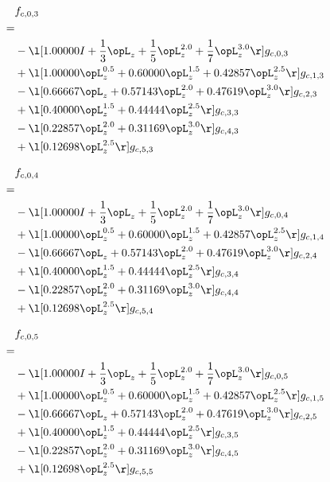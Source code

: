 \begin{alignat}{2} 
\label{eq:f_03_0} 
& f_{c,0,3} \nonumber \\ 
 = \\ 
& - \l[  1.00000 I + \frac{1}{3} \opL_z + \frac{1}{5} \opL_z^{2.0} + \frac{1}{7} \opL_z^{3.0}  \r] g_{c,0,3} \nonumber \\ 
& + \l[  1.00000 \opL_z^{0.5} +  0.60000 \opL_z^{1.5} +  0.42857 \opL_z^{2.5}  \r] g_{c,1,3} \nonumber \\ 
& - \l[  0.66667 \opL_z +  0.57143 \opL_z^{2.0} +  0.47619 \opL_z^{3.0}  \r] g_{c,2,3} \nonumber \\ 
& + \l[  0.40000 \opL_z^{1.5} +  0.44444 \opL_z^{2.5}  \r] g_{c,3,3} \nonumber \\ 
& - \l[  0.22857 \opL_z^{2.0} +  0.31169 \opL_z^{3.0}  \r] g_{c,4,3} \nonumber \\ 
& + \l[  0.12698 \opL_z^{2.5}  \r] g_{c,5,3} \nonumber \\ 
\end{alignat} 


\begin{alignat}{2} 
\label{eq:f_04_0} 
& f_{c,0,4} \nonumber \\ 
 = \\ 
& - \l[  1.00000 I + \frac{1}{3} \opL_z + \frac{1}{5} \opL_z^{2.0} + \frac{1}{7} \opL_z^{3.0}  \r] g_{c,0,4} \nonumber \\ 
& + \l[  1.00000 \opL_z^{0.5} +  0.60000 \opL_z^{1.5} +  0.42857 \opL_z^{2.5}  \r] g_{c,1,4} \nonumber \\ 
& - \l[  0.66667 \opL_z +  0.57143 \opL_z^{2.0} +  0.47619 \opL_z^{3.0}  \r] g_{c,2,4} \nonumber \\ 
& + \l[  0.40000 \opL_z^{1.5} +  0.44444 \opL_z^{2.5}  \r] g_{c,3,4} \nonumber \\ 
& - \l[  0.22857 \opL_z^{2.0} +  0.31169 \opL_z^{3.0}  \r] g_{c,4,4} \nonumber \\ 
& + \l[  0.12698 \opL_z^{2.5}  \r] g_{c,5,4} \nonumber \\ 
\end{alignat} 


\begin{alignat}{2} 
\label{eq:f_05_0} 
& f_{c,0,5} \nonumber \\ 
 = \\ 
& - \l[  1.00000 I + \frac{1}{3} \opL_z + \frac{1}{5} \opL_z^{2.0} + \frac{1}{7} \opL_z^{3.0}  \r] g_{c,0,5} \nonumber \\ 
& + \l[  1.00000 \opL_z^{0.5} +  0.60000 \opL_z^{1.5} +  0.42857 \opL_z^{2.5}  \r] g_{c,1,5} \nonumber \\ 
& - \l[  0.66667 \opL_z +  0.57143 \opL_z^{2.0} +  0.47619 \opL_z^{3.0}  \r] g_{c,2,5} \nonumber \\ 
& + \l[  0.40000 \opL_z^{1.5} +  0.44444 \opL_z^{2.5}  \r] g_{c,3,5} \nonumber \\ 
& - \l[  0.22857 \opL_z^{2.0} +  0.31169 \opL_z^{3.0}  \r] g_{c,4,5} \nonumber \\ 
& + \l[  0.12698 \opL_z^{2.5}  \r] g_{c,5,5} \nonumber \\ 
\end{alignat} 


